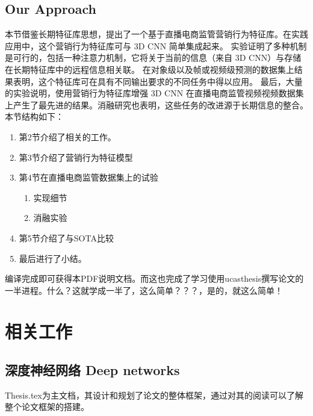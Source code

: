 \subsection{Our Approach}
本节借鉴长期特征库思想，提出了一个基于直播电商监管营销行为特征库。在实践应用中，这个营销行为特征库可与 3D CNN 简单集成起来。 实验证明了多种机制是可行的，包括一种注意力机制，它将关于当前的信息（来自 3D CNN）与存储在长期特征库中的远程信息相关联。 在对象级以及帧或视频级预测的数据集上结果表明，这个特征库可在具有不同输出要求的不同任务中得以应用。 最后，大量的实验说明，使用营销行为特征库增强 3D CNN 在直播电商监管视频视频数据集上产生了最先进的结果。消融研究也表明，这些任务的改进源于长期信息的整合。
本节结构如下：

\begin{enumerate}
    \item 第2节介绍了相关的工作。

    \item 第3节介绍了营销行为特征模型

    \item 第4节在直播电商监管数据集上的试验
        \begin{enumerate}
            \item 实现细节
            \item 消融实验
        \end{enumerate}
    \item 第5节介绍了与SOTA比较
    \item 最后进行了小结。
\end{enumerate}

编译完成即可获得本PDF说明文档。而这也完成了学习使用ucasthesis撰写论文的一半进程。什么？这就学成一半了，这么简单？？？，是的，就这么简单！

\section{相关工作}

\subsection{深度神经网络 Deep networks}

Thesis.tex为主文档，其设计和规划了论文的整体框架，通过对其的阅读可以了解整个论文框架的搭建。

